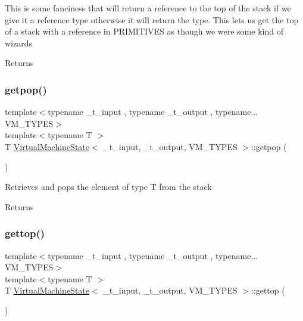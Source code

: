 This is some fanciness that will return a reference to the top of the stack if we give it a reference type otherwise it will return the type. This lets us get the top of a stack with a reference in P\+R\+I\+M\+I\+T\+I\+V\+ES as though we were some kind of wizards \begin{DoxyReturn}{Returns}

\end{DoxyReturn}
\mbox{\label{class_virtual_machine_state_a5c5373c434e10372d9e9a17df1532965}} 
\subsubsection{\texorpdfstring{getpop()}{getpop()}}
{\footnotesize\ttfamily template$<$typename \+\_\+t\+\_\+input , typename \+\_\+t\+\_\+output , typename... V\+M\+\_\+\+T\+Y\+P\+ES$>$ \\
template$<$typename T $>$ \\
T \hyperlink{class_virtual_machine_state}{Virtual\+Machine\+State}$<$ \+\_\+t\+\_\+input, \+\_\+t\+\_\+output, V\+M\+\_\+\+T\+Y\+P\+ES $>$\+::getpop (\begin{DoxyParamCaption}{ }\end{DoxyParamCaption})\hspace{0.3cm}{\ttfamily [inline]}}

Retrieves and pops the element of type T from the stack \begin{DoxyReturn}{Returns}

\end{DoxyReturn}
\mbox{\label{class_virtual_machine_state_ac5a22fb0fbfa599bcb5e6a5961598815}} 
\subsubsection{\texorpdfstring{gettop()}{gettop()}}
{\footnotesize\ttfamily template$<$typename \+\_\+t\+\_\+input , typename \+\_\+t\+\_\+output , typename... V\+M\+\_\+\+T\+Y\+P\+ES$>$ \\
template$<$typename T $>$ \\
T \hyperlink{class_virtual_machine_state}{Virtual\+Machine\+State}$<$ \+\_\+t\+\_\+input, \+\_\+t\+\_\+output, V\+M\+\_\+\+T\+Y\+P\+ES $>$\+::gettop (\begin{DoxyParamCaption}{ }\end{DoxyParamCaption})\hspace{0.3cm}{\ttfamily [inline]}}

